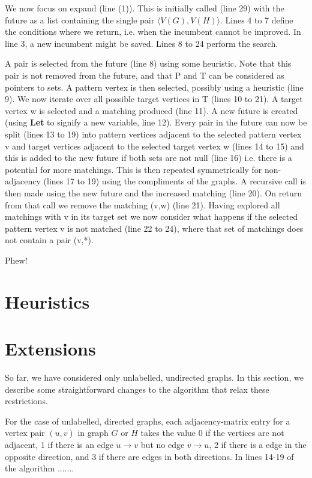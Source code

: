 \documentclass[letterpaper]{article}
\begin{document}
\bigskip
\noindent
We now focus on expand (line (1)). This is initially called (line 29) with the future as a list containing the single pair $\langle V(G),V(H) \rangle$. Lines 4 to 7 define the conditions 
where we return, i.e. when the incumbent cannot be improved. In line 3, a new incumbent might be saved. Lines 8 to 24 perform the search.

\bigskip
\noindent
A pair is selected from the future (line 8) using some heuristic. Note that this pair is not removed from the future, and that P and T can be considered as pointers to sets. A pattern vertex is then selected, possibly using a heuristic (line 9). We now iterate over all possible target vertices in T (lines 10 to 21). A target vertex w is selected and a matching produced (line 11). A new future is created (using {\bf Let} to signify a new variable, line 12). Every pair in the future can now be split (lines 13 to 19) into pattern vertices adjacent to the selected pattern vertex v and target vertices adjacent to the selected target vertex w (lines 14 to 15) and this is added to the new future if both sets are not null (line 16) i.e. there is a potential for more matchings. This is then repeated symmetrically for non-adjacency (lines 17 to 19) using the compliments of the graphs.
A recursive call is then made using the new future and the increased matching (line 20). On return from that call we remove the matching (v,w) (line 21). Having explored all matchings with v in its target set we now consider what happens if the selected pattern vertex v is not matched (line 22 to 24), where that set of matchings does not contain a pair (v,*).

\bigskip
\bigskip
\bigskip
\bigskip
\noindent
Phew!

\section{Heuristics}



\section{Extensions}

So far, we have considered only unlabelled, undirected graphs. In this section, we
describe some straightforward changes to the algorithm that relax these restrictions.

For the case of unlabelled, directed graphs, each adjacency-matrix entry for a vertex
pair $(u,v)$ in graph $G$ or $H$ takes the value 0 if the vertices are not adjacent,
1 if there is an edge $u \rightarrow v$ but no edge $v \rightarrow u$, 2 if there is a
edge in the opposite direction, and 3 if there are edges in both directions. In lines
14-19 of the algorithm .......
\end{document}
